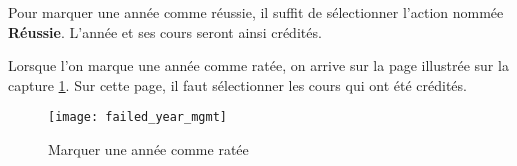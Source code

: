 Pour marquer une année comme réussie, il suffit de sélectionner l'action nommée \textbf{Réussie}. L'année et ses cours seront ainsi crédités. 

Lorsque l'on marque une année comme ratée, on arrive sur la page illustrée sur la capture \ref{fig:fail_year}. Sur cette page, il faut sélectionner les cours qui ont été crédités.

\begin{figure}[htb]
\centering
\caption{Marquer une année comme ratée}
\label{fig:fail_year}
\texttt{[image: failed\_year\_mgmt]}

\end{figure}


